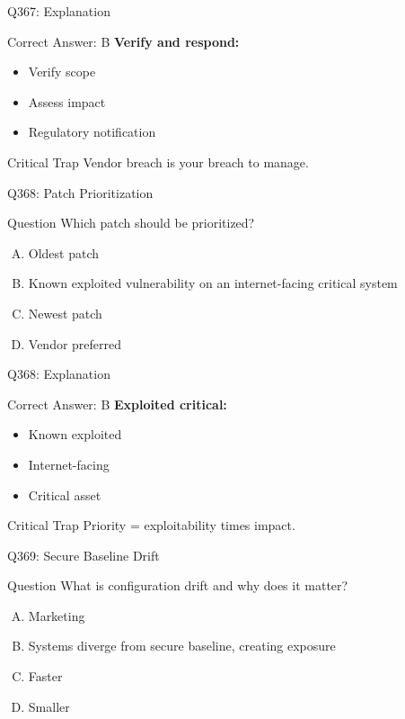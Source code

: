 \documentclass{beamer}
\begin{document}
	\begin{frame}{Q367: Explanation}
		\begin{block}{Correct Answer: B}
			\textbf{Verify and respond:}
			\begin{itemize}
				\item Verify scope
				\item Assess impact
				\item Regulatory notification
			\end{itemize}
		\end{block}
		\begin{alertblock}{Critical Trap}
			Vendor breach is your breach to manage.
		\end{alertblock}
	\end{frame}
	
	\begin{frame}{Q368: Patch Prioritization}
		\begin{block}{Question}
			Which patch should be prioritized?
		\end{block}
		\begin{enumerate}[(A)]
			\item Oldest patch
			\item Known exploited vulnerability on an internet-facing critical system
			\item Newest patch
			\item Vendor preferred
		\end{enumerate}
	\end{frame}
	
	\begin{frame}{Q368: Explanation}
		\begin{block}{Correct Answer: B}
			\textbf{Exploited critical:}
			\begin{itemize}
				\item Known exploited
				\item Internet-facing
				\item Critical asset
			\end{itemize}
		\end{block}
		\begin{alertblock}{Critical Trap}
			Priority = exploitability times impact.
		\end{alertblock}
	\end{frame}
	
	\begin{frame}{Q369: Secure Baseline Drift}
		\begin{block}{Question}
			What is configuration drift and why does it matter?
		\end{block}
		\begin{enumerate}[(A)]
			\item Marketing
			\item Systems diverge from secure baseline, creating exposure
			\item Faster
			\item Smaller
		\end{enumerate}
	\end{frame}
	
\end{document}
